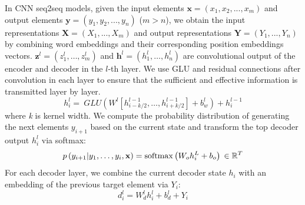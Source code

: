 In CNN seq2seq models, given the input elements $\textbf{x} = (x_{1},x_{2},...,x_{m})$ and 
output elements $\textbf{y} = (y_{1}, y_{2},..., y_{n})$ ($m>n$),
we obtain the input representations  $\mathbf{X} = (X_1,...,X_m)$ 
and output representations $\mathbf{Y}=(Y_1,...,Y_n)$ by combining
word embeddings and their corresponding position embeddings vectors. 
$\mathbf { z } ^ { l } = \left( z _ { 1 } ^ { l } , \ldots , z _ { m } ^ { l } \right)$ and $\mathbf { h } ^ { l } = \left( h _ { 1 } ^ { l } , \ldots , h _ { n } ^ { l } \right)$ 
are convolutional output of the encoder and decoder in the $l$-th layer.
We use GLU \cite{DauphinFAG17} and residual connections \cite{HeZRS16} after convolution 
in each layer to ensure that the sufficient and effective information is transmitted layer by layer.  
\begin{equation}
h _ { i } ^ { l } = ~ GLU \left( W ^ { l } \left[ h _ {i-k/2 } ^ { l - 1 } , \ldots , h _ { i+k/2 } ^ { l - 1 } \right] + b _ { w } ^ { l } \right)  + h _ { i } ^ { l - 1 }
\end{equation} 
where \textit{k} is kernel width.
We compute the probability
distribution of generating the next elements $y_{i+1}$
based on the current state and transform the top
decoder output $h_{i}^{l}$ via softmax:
\begin{equation}
p \left( y _ { i + 1 } | y _ { 1 } , \ldots , y _ { i } , \mathbf { x } \right) = 
 \operatorname { softmax } \left( W _ { o } h _ { i } ^ { L } + b _ { o } \right) \\ 
\in \mathbb { R } ^ { T }
\end{equation}
For each decoder layer, 
we combine the current decoder state $h_{i}$
with an embedding of the previous target element via $Y_{i}$:
\begin{equation}
d _ { i } ^ { l } = W _ { d } ^ { l } h _ { i } ^ { l } + b _ { d } ^ { l } + Y _ { i }
\end{equation}


